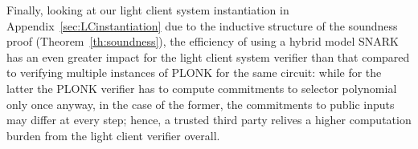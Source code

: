 \noindent Finally, looking at our light client system instantiation in Appendix~\ref{sec:LCinstantiation} due to the inductive structure of the soundness proof (Theorem~\ref{th:soundness}), 
the efficiency of using a hybrid model SNARK has an even greater impact for the light client system verifier than that compared to verifying multiple instances of PLONK for the same circuit:
while for the latter the PLONK verifier has to compute commitments to selector polynomial only once anyway, in the case of the former, the commitments to public inputs may differ 
at every step; hence, a trusted third party relives a higher computation burden from the light client verifier overall. 


